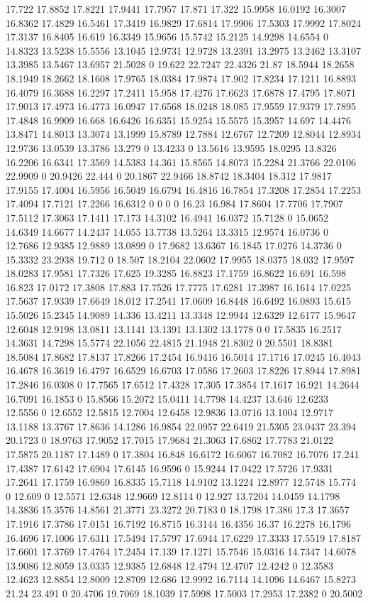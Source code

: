 17.722 17.8852 17.8221 17.9441 17.7957 17.871 17.322 15.9958 16.0192 16.3007 16.8362 17.4829 16.5461 17.3419 16.9829 17.6814 17.9906 17.5303 17.9992 17.8024 17.3137 16.8405 16.619 16.3349 15.9656 15.5742 15.2125 14.9298 14.6554 0 14.8323 13.5238 15.5556 13.1045 12.9731 12.9728 13.2391 13.2975 13.2462 13.3107 13.3985 13.5467 13.6957 21.5028 0 19.622 22.7247 22.4326 21.87 18.5944 18.2658 18.1949 18.2662 18.1608 17.9765 18.0384 17.9874 17.902 17.8234 17.1211 16.8893 16.4079 16.3688 16.2297 17.2411 15.958 17.4276 17.6623 17.6878 17.4795 17.8071 17.9013 17.4973 16.4773 16.0947 17.6568 18.0248 18.085 17.9559 17.9379 17.7895 17.4848 16.9909 16.668 16.6426 16.6351 15.9254 15.5575 15.3957 14.697 14.4476 13.8471 14.8013 13.3074 13.1999 15.8789 12.7884 12.6767 12.7209 12.8044 12.8934 12.9736 13.0539 13.3786 13.279 0 13.4233 0 13.5616 13.9595 18.0295 13.8326 16.2206 16.6341 17.3569 14.5383 14.361 15.8565 14.8073 15.2284 21.3766 22.0106 22.9909 0 20.9426 22.444 0 20.1867 22.9466 18.8742 18.3404 18.312 17.9817 17.9155 17.4004 16.5956 16.5049 16.6794 16.4816 16.7854 17.3208 17.2854 17.2253 17.4094 17.7121 17.2266 16.6312 0 0 0 0 16.23 16.984 17.8604 17.7706 17.7907 17.5112 17.3063 17.1411 17.173 14.3102 16.4941 16.0372 15.7128 0 15.0652 14.6349 14.6677 14.2437 14.055 13.7738 13.5264 13.3315 12.9574 16.0736 0 12.7686 12.9385 12.9889 13.0899 0 17.9682 13.6367 16.1845 17.0276 14.3736 0 15.3332 23.2938 19.712 0 18.507 18.2104 22.0602 17.9955 18.0375 18.032 17.9597 18.0283 17.9581 17.7326 17.625 19.3285 16.8823 17.1759 16.8622 16.691 16.598 16.823 17.0172 17.3808 17.883 17.7526 17.7775 17.6281 17.3987 16.1614 17.0225 17.5637 17.9339 17.6649 18.012 17.2541 17.0609 16.8448 16.6492 16.0893 15.615 15.5026 15.2345 14.9089 14.336 13.4211 13.3348 12.9944 12.6329 12.6177 15.9647 12.6048 12.9198 13.0811 13.1141 13.1391 13.1302 13.1778 0 0 17.5835 16.2517 14.3631 14.7298 15.5774 22.1056 22.4815 21.1948 21.8302 0 20.5501 18.8381 18.5084 17.8682 17.8137 17.8266 17.2454 16.9416 16.5014 17.1716 17.0245 16.4043 16.4678 16.3619 16.4797 16.6529 16.6703 17.0586 17.2603 17.8226 17.8944 17.8981 17.2846 16.0308 0 17.7565 17.6512 17.4328 17.305 17.3854 17.1617 16.921 14.2644 16.7091 16.1853 0 15.8566 15.2072 15.0411 14.7798 14.4237 13.646 12.6233 12.5556 0 12.6552 12.5815 12.7004 12.6458 12.9836 13.0716 13.1004 12.9717 13.1188 13.3767 17.8636 14.1286 16.9854 22.0957 22.6419 21.5305 23.0437 23.394 20.1723 0 18.9763 17.9052 17.7015 17.9684 21.3063 17.6862 17.7783 21.0122 17.5875 20.1187 17.1489 0 17.3804 16.848 16.6172 16.6067 16.7082 16.7076 17.241 17.4387 17.6142 17.6904 17.6145 16.9596 0 15.9244 17.0422 17.5726 17.9331 17.2641 17.1759 16.9869 16.8335 15.7118 14.9102 13.1224 12.8977 12.5748 15.774 0 12.609 0 12.5571 12.6348 12.9669 12.8114 0 12.927 13.7204 14.0459 14.1798 14.3836 15.3576 14.8561 21.3771 23.3272 20.7183 0 18.1798 17.386 17.3 17.3657 17.1916 17.3786 17.0151 16.7192 16.8715 16.3144 16.4356 16.37 16.2278 16.1796 16.4696 17.1006 17.6311 17.5494 17.5797 17.6944 17.6229 17.3333 17.5519 17.8187 17.6601 17.3769 17.4764 17.2454 17.139 17.1271 15.7546 15.0316 14.7347 14.6078 13.9086 12.8059 13.0335 12.9385 12.6848 12.4794 12.4707 12.4242 0 12.3583 12.4623 12.8854 12.8009 12.8709 12.686 12.9992 16.7114 14.1096 14.6467 15.8273 21.24 23.491 0 20.4706 19.7069 18.1039 17.5998 17.5003 17.2953 17.2382 0 20.5002 